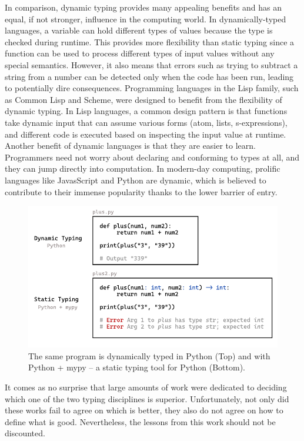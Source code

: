 In comparison, dynamic typing provides many appealing benefits and has an equal, if not stronger, influence in the computing world. In dynamically-typed languages, a variable can hold different types of values because the type is checked during runtime. This provides more flexibility than static typing since a function can be used to process different types of input values without any special semantics. However, it also means that errors such as trying to subtract a string from a number can be detected only when the code has been run, leading to potentially dire consequences. Programming languages in the Lisp family, such as Common Lisp and Scheme, were designed to benefit from the flexibility of dynamic typing. In Lisp languages, a common design pattern is that functions take dynamic input that can assume various forms (atom, lists, s-expressions), and different code is executed based on inspecting the input value at runtime. Another benefit of dynamic languages is that they are easier to learn. Programmers need not worry about declaring and conforming to types at all, and they can jump directly into computation. In modern-day computing, prolific languages like JavasScript and Python are dynamic, which is believed to contribute to their immense popularity thanks to the lower barrier of entry.

\begin{figure}[hbt]
  \includegraphics[width=\linewidth]{TypedVsUntyped.pdf}
  \caption{
    \label{fig:typed-vs-untyped}
   The same program is dynamically typed in Python (Top) and with Python + mypy -- a static typing tool for Python (Bottom).
    }
\end{figure}

It comes as no surprise that large amounts of work were dedicated to deciding which one of the two typing disciplines is superior. Unfortunately, not only did these works fail to agree on which is better, they also do not agree on how to define what is good. Nevertheless, the lessons from this work should not be discounted.  


